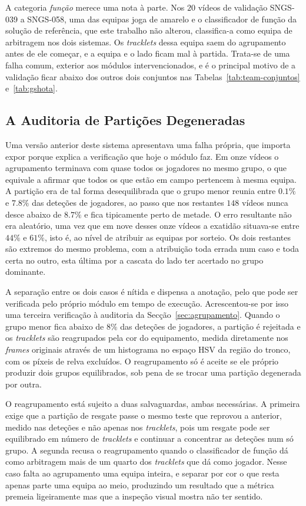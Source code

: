 A categoria \emph{função} merece uma nota à parte. Nos $20$ vídeos de validação SNGS-039 a
SNGS-058, uma das equipas joga de amarelo e o classificador de função da solução de referência,
que este trabalho não alterou, classifica-a como equipa de arbitragem nos dois sistemas. Os
\emph{tracklets} dessa equipa saem do agrupamento antes de ele começar, e a equipa e o lado ficam
mal à partida. Trata-se de uma falha comum, exterior aos módulos intervencionados, e é o principal
motivo de a validação ficar abaixo dos outros dois conjuntos nas Tabelas~\ref{tab:team-conjuntos}
e~\ref{tab:gshota}.

\subsection{A Auditoria de Partições Degeneradas}\label{sec:res_equipa_degenerada}

Uma versão anterior deste sistema apresentava uma falha própria, que importa expor porque explica a
verificação que hoje o módulo faz. Em onze vídeos o agrupamento terminava com quase todos os
jogadores no mesmo grupo, o que equivale a afirmar que todos os que estão em campo pertencem à mesma
equipa. A partição era de tal forma desequilibrada que o grupo menor reunia entre $0.1\%$ e $7.8\%$
das deteções de jogadores, ao passo que nos restantes $148$ vídeos nunca desce abaixo de $8.7\%$ e
fica tipicamente perto de metade. O erro resultante não era aleatório, uma vez que em nove desses onze
vídeos a exatidão situava-se entre $44\%$ e $61\%$, isto é, ao nível de atribuir as equipas por
sorteio. Os dois restantes são extremos do mesmo problema, com a atribuição toda errada num caso e
toda certa no outro, esta última por a cascata do lado ter acertado no grupo dominante.

A separação entre os dois casos é nítida e dispensa a anotação, pelo que pode ser verificada pelo
próprio módulo em tempo de execução. Acrescentou-se por isso uma terceira verificação à auditoria da
Secção~\ref{sec:agrupamento}. Quando o grupo menor fica abaixo de $8\%$ das deteções de jogadores, a
partição é rejeitada e os \emph{tracklets} são reagrupados pela cor do equipamento, medida
diretamente nos \emph{frames} originais através de um histograma no espaço HSV da região do tronco,
com os píxeis de relva excluídos. O reagrupamento só é aceite se ele próprio produzir dois grupos
equilibrados, sob pena de se trocar uma partição degenerada por outra.

O reagrupamento está sujeito a duas salvaguardas, ambas necessárias. A primeira exige que a
partição de resgate passe o mesmo teste que reprovou a anterior, medido nas deteções e não apenas
nos \emph{tracklets}, pois um resgate pode ser equilibrado em número de \emph{tracklets} e continuar
a concentrar as deteções num só grupo. A segunda recusa o reagrupamento quando o classificador de
função dá como arbitragem mais de um quarto dos \emph{tracklets} que dá como jogador. Nesse caso
falta ao agrupamento uma equipa inteira, e separar por cor o que resta apenas parte uma equipa ao
meio, produzindo um resultado que a métrica premeia ligeiramente mas que a inspeção visual mostra
não ter sentido.

